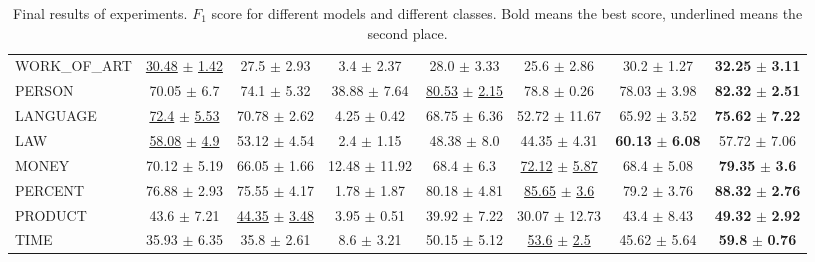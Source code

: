 \begin{table*}[t!]
\begin{center}
\begin{tabular}{|l|ccccccc|}
WORK\_OF\_ART & \underline{30.48} $\pm$ \underline{1.42} & 27.5 $\pm$ 2.93 & 3.4 $\pm$ 2.37 & 28.0 $\pm$ 3.33 & 25.6 $\pm$ 2.86 & 30.2 $\pm$ 1.27 & \textbf{32.25} $\pm$ \textbf{3.11} \\
PERSON & 70.05 $\pm$ 6.7 & 74.1 $\pm$ 5.32 & 38.88 $\pm$ 7.64 & \underline{80.53} $\pm$ \underline{2.15} & 78.8 $\pm$ 0.26 & 78.03 $\pm$ 3.98 & \textbf{82.32} $\pm$ \textbf{2.51} \\
LANGUAGE & \underline{72.4} $\pm$ \underline{5.53} & 70.78 $\pm$ 2.62 & 4.25 $\pm$ 0.42 & 68.75 $\pm$ 6.36 & 52.72 $\pm$ 11.67 & 65.92 $\pm$ 3.52 & \textbf{75.62} $\pm$ \textbf{7.22} \\
LAW & \underline{58.08} $\pm$ \underline{4.9} & 53.12 $\pm$ 4.54 & 2.4 $\pm$ 1.15 & 48.38 $\pm$ 8.0 & 44.35 $\pm$ 4.31 & \textbf{60.13} $\pm$ \textbf{6.08} & 57.72 $\pm$ 7.06 \\
MONEY & 70.12 $\pm$ 5.19 & 66.05 $\pm$ 1.66 & 12.48 $\pm$ 11.92 & 68.4 $\pm$ 6.3 & \underline{72.12} $\pm$ \underline{5.87} & 68.4 $\pm$ 5.08 & \textbf{79.35} $\pm$ \textbf{3.6} \\
PERCENT & 76.88 $\pm$ 2.93 & 75.55 $\pm$ 4.17 & 1.78 $\pm$ 1.87 & 80.18 $\pm$ 4.81 & \underline{85.65} $\pm$ \underline{3.6} & 79.2 $\pm$ 3.76 & \textbf{88.32} $\pm$ \textbf{2.76} \\
PRODUCT & 43.6 $\pm$ 7.21 & \underline{44.35} $\pm$ \underline{3.48} & 3.95 $\pm$ 0.51 & 39.92 $\pm$ 7.22 & 30.07 $\pm$ 12.73 & 43.4 $\pm$ 8.43 & \textbf{49.32} $\pm$ \textbf{2.92} \\
TIME & 35.93 $\pm$ 6.35 & 35.8 $\pm$ 2.61 & 8.6 $\pm$ 3.21 & 50.15 $\pm$ 5.12 & \underline{53.6} $\pm$ \underline{2.5} & 45.62 $\pm$ 5.64 & \textbf{59.8} $\pm$ \textbf{0.76} \\
\hline
\end{tabular}
\end{center}
\caption{\label{baseline_sl} Final results of experiments. $F_1$ score for different models and different classes. Bold means the best score, underlined means the second place.}
\end{table*}




